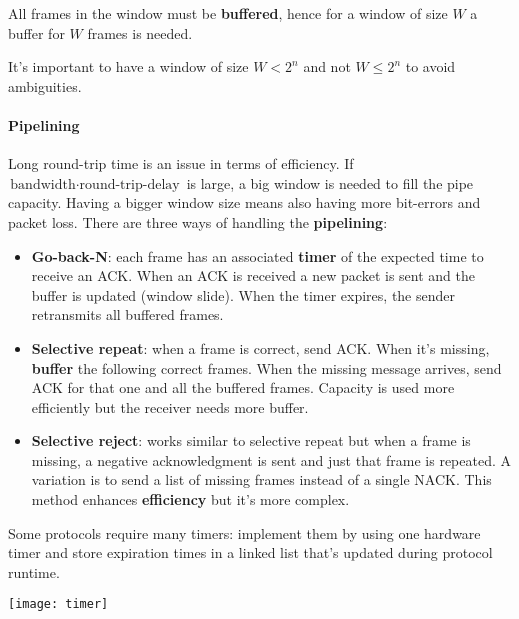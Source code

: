 \begin{note}
	All frames in the window must be \textbf{buffered}, hence for a window of size $W$ a buffer for $W$ frames is needed.
\end{note}

\begin{observation}
	It's important to have a window of size $W < 2^n$ and not $W \leq 2^n$ to avoid ambiguities.
\end{observation}

\paragraph{Pipelining}
Long round-trip time is an issue in terms of efficiency. If $\text{bandwidth} \cdot \text{round-trip-delay}$ is large, a big window is needed to fill the pipe capacity. Having a bigger window size means also having more bit-errors and packet loss.\newpage
\noindent There are three ways of handling the \textbf{pipelining}:
\begin{itemize}
	\item \textbf{Go-back-N}: each frame has an associated \textbf{timer} of the expected time to receive an ACK. When an ACK is received a new packet is sent and the buffer is updated (window slide). When the timer expires, the sender retransmits all buffered frames.
	\item \textbf{Selective repeat}: when a frame is correct, send ACK. When it's missing, \textbf{buffer} the following correct frames. When the missing message arrives, send ACK for that one and all the buffered frames. Capacity is used more efficiently but the receiver needs more buffer.
	\item \textbf{Selective reject}: works similar to selective repeat but when a frame is missing, a negative acknowledgment is sent and just that frame is repeated. A variation is to send a list of missing frames instead of a single NACK. This method enhances \textbf{efficiency} but it's more complex.
\end{itemize}

\begin{figure}[!h]
	\hfil
	\hfil
	\hfil
\end{figure}

\begin{note}
	Some protocols require many timers: implement them by using one hardware timer and store expiration times in a linked list that's updated during protocol runtime.
	\begin{center}
		\texttt{[image: timer]}
	\end{center}
\end{note}

